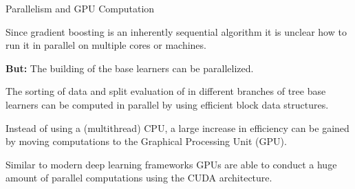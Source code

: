 \begin{vbframe}{Parallelism and GPU Computation}

Since gradient boosting is an inherently sequential algorithm it is unclear how to run it in parallel on multiple cores or machines.

\lz

\textbf{But:} The building of the base learners can be parallelized.

\lz

The sorting of data and split evaluation of in different branches of tree base learners can be computed in parallel by using efficient block data structures.

\lz

Instead of using a (multithread) CPU, a large increase in efficiency can be gained by moving computations to the Graphical Processing Unit (GPU).

\lz

Similar to modern deep learning frameworks GPUs are able to conduct a huge amount of parallel computations using the CUDA architecture.


\end{vbframe}

